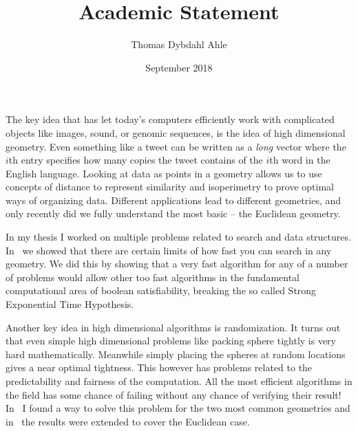 \documentclass[10pt]{article}
\title{Academic Statement}
\author{Thomas Dybdahl Ahle}
\date{September 2018}
\begin{document}
\maketitle


The key idea that has let today's computers efficiently work with complicated objects like images, sound, or genomic sequences, is the idea of high dimensional geometry.
Even something like a tweet can be written as a \emph{long} vector where the $i$th entry specifies how many copies the tweet contains of the $i$th word in the English language.
Looking at data as points in a geometry allows us to use concepts of distance to represent similarity and isoperimetry to prove optimal ways of organizing data.
Different applications lead to different geometries, and only recently did we fully understand the most basic -- the Euclidean geometry.


In my thesis I worked on multiple problems related to search and data structures.
In~\cite{ahle2016complexity} we showed that there are certain limits of how fast you can search in any geometry.
We did this by showing that a very fast algorithm for any of a number of problems would allow other too fast algorithms in the fundamental computational area of boolean satisfiability, breaking the so called Strong Exponential Time Hypothesis.

Another key idea in high dimensional algorithms is randomization.
It turns out that even simple high dimensional problems like packing sphere tightly is very hard mathematically.
Meanwhile simply placing the spheres at random locations gives a near optimal tightness.
This however has problems related to the predictability and fairness of the computation.
All the most efficient algorithms in the field has some chance of failing without any chance of verifying their result!
In~\cite{ahle2017optimal} I found a way to solve this problem for the two most common geometries and in~\cite{wei2018optimal} the results were extended to cover the Euclidean case.
\end{document}
